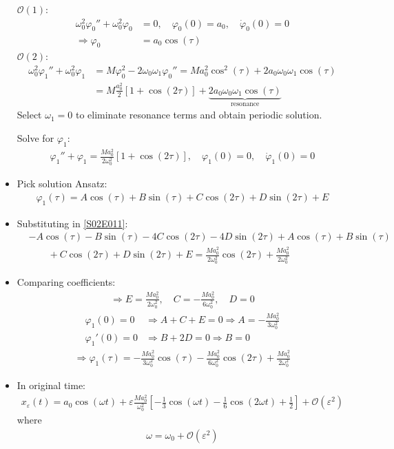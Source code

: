 \begin{solution}[2.3]
\begin{itemize}
	$\mathcal{O}(1)$:
	\begin{align}
		\omega_0^2\varphi_0'' + \omega_0^2 \varphi_0 &= 0, \quad \varphi_0(0) = a_0, \quad \dot{\varphi}_0(0)=0 \\
		\Longrightarrow \varphi_0 &= a_0 \cos(\tau)
	\end{align}
	$\mathcal{O}(2)$:
	\begin{align}
		\omega_0^2\varphi_1'' + \omega_0^2 \varphi_1 &= M \varphi_0^2 - 2\omega_0\omega_1\varphi_0'' = Ma_0^2 \cos^2(\tau) + 2a_0\omega_0\omega_1 \cos(\tau) \\
		&= M \frac{a_0^2}{2}[1 + \cos(2\tau)] + \underbrace{2a_0\omega_0\omega_1\cos(\tau)}_{\text{resonance}}
	\end{align}
	Select $\omega_1 = 0$ to eliminate resonance terms and obtain periodic solution.
	
	Solve for $\varphi_1$:
	\begin{align} \label{S02E011}
		\varphi_1'' + \varphi_1 = \frac{Ma_0^2}{2\omega_0^2}[1 + \cos(2\tau)], \quad \varphi_1(0)=0, \quad \dot{\varphi}_1(0)=0
	\end{align}
	\item Pick solution Ansatz:
	\begin{align}
		\varphi_1(\tau) = A\cos(\tau) + B\sin(\tau) + C\cos(2\tau) + D\sin(2\tau) + E
	\end{align}
	\item Substituting in \eqref{S02E011}:
	\begin{align}
		&-A\cos(\tau) - B\sin(\tau) - 4C\cos(2\tau) - 4D\sin(2\tau) + A\cos(\tau) + B\sin(\tau) \\
		&\qquad+ C\cos(2\tau) + D\sin(2\tau) + E 
		= \frac{Ma_0^2}{2\omega_0^2}\cos(2\tau) + \frac{Ma_0^2}{2\omega_0^2}
	\end{align}
	\item Comparing coefficients:
	\begin{align}
		\Longrightarrow E = \frac{Ma_0^2}{2\omega_0^2}, \quad C = -\frac{Ma_0^2}{6\omega_0^2},\quad D=0
	\end{align}
	\begin{align}
		\varphi_1(0)=0 &\Longrightarrow A+C+E=0 \Longrightarrow A = -\frac{Ma_0^2}{3\omega_0^2} \\
		\varphi_1'(0)=0 &\Longrightarrow B+2D=0 \Longrightarrow B=0
	\end{align}
	\begin{align}
		\Longrightarrow \boxed{\varphi_1(\tau) = -\frac{Ma_0^2}{3\omega_0^2}\cos(\tau) - \frac{Ma_0^2}{6\omega_0^2}\cos(2\tau) + \frac{Ma_0^2}{2\omega_0^2}}
	\end{align}
	\item In original time:
	\begin{align}
		x_\varepsilon(t) = a_0\cos(\omega t) + \varepsilon \frac{Ma_0^2}{\omega_0^2} \left[ -\frac{1}{3}\cos(\omega t) - \frac{1}{6}\cos(2\omega t) + \frac{1}{2} \right] + \mathcal{O}(\varepsilon^2)
	\end{align}
	where
	\begin{align}
		\omega = \omega_0 + \mathcal{O}(\varepsilon^2)
	\end{align}
\end{itemize}
\end{solution}


